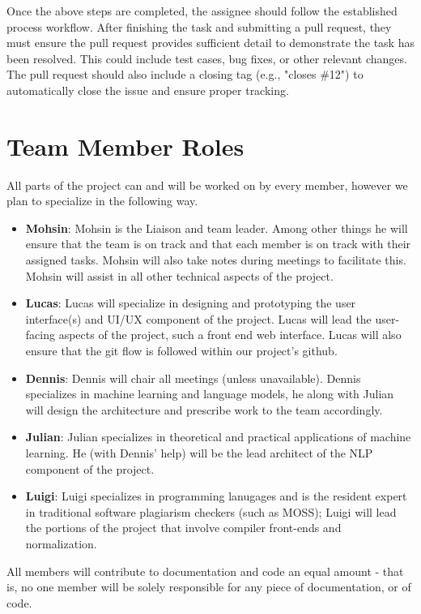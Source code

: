 \documentclass{article}
\begin{document}
Once the above steps are completed, the assignee should follow the established 
process workflow. After finishing the task and submitting a pull request, they 
must ensure the pull request provides sufficient detail to demonstrate the task 
has been resolved. This could include test cases, bug fixes, or other relevant 
changes. The pull request should also include a closing tag (e.g., "closes \#12") 
to automatically close the issue and ensure proper tracking.

\section{Team Member Roles}
All parts of the project can and will be worked on by every member, however we plan to specialize in the following way.

\begin{itemize}
    \item \textbf{Mohsin}: Mohsin is the Liaison and team leader. Among other things he will ensure that the team is on track and that each member is on track with their assigned tasks. Mohsin will also take notes during meetings to facilitate this. Mohsin will assist in all other technical aspects of the project.
    \item \textbf{Lucas}: Lucas will specialize in designing and prototyping the user interface(s) and UI/UX component of the project. Lucas will lead the user-facing aspects of the project, such a front end web interface. Lucas will also ensure that the git flow is followed within our project's github.
    \item \textbf{Dennis}: Dennis will chair all meetings (unless unavailable). Dennis specializes in machine learning and language models, he along with Julian will design the architecture and prescribe work to the team accordingly.
    \item \textbf{Julian}: Julian specializes in theoretical and practical applications of machine learning. He (with Dennis' help) will be the lead architect of the NLP component of the project.
    \item \textbf{Luigi}: Luigi specializes in programming lanugages and is the resident expert in traditional software plagiarism checkers (such as MOSS); Luigi will lead the portions of the project that involve compiler front-ends and normalization.
\end{itemize}

All members will contribute to documentation and code an equal amount - that is, no one member will be solely responsible for any piece of documentation, or of code.
\end{document}
